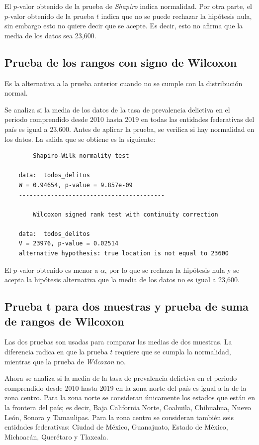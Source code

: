 \documentclass[12pt]{article}
\begin{document}
	El $p$-valor obtenido de la prueba de {\em Shapiro} indica normalidad. Por otra parte, el $p$-valor obtenido de la prueba $t$ indica que no se puede rechazar la hipótesis nula, sin embargo esto no quiere decir que se acepte. Es decir, esto no afirma que la media de los datos sea 23,600. 
	
	\subsection{Prueba de los rangos con signo de Wilcoxon}
	
	Es la alternativa a la prueba anterior cuando no se cumple con la distribución normal.
	
	Se analiza si la media de los datos de la tasa de prevalencia delictiva en el periodo comprendido desde 2010 hasta 2019 en todas las entidades federativas del país es igual a 23,600. Antes de aplicar la prueba, se verifica si hay normalidad en los datos. La salida que se obtiene es la siguiente:
	\begin{verbatim}
		Shapiro-Wilk normality test
	
	data:  todos_delitos
	W = 0.94654, p-value = 9.857e-09
	-----------------------------------------
		
		Wilcoxon signed rank test with continuity correction
	
	data:  todos_delitos
	V = 23976, p-value = 0.02514
	alternative hypothesis: true location is not equal to 23600
	\end{verbatim}

	El $p$-valor obtenido es menor a $\alpha$, por lo que se rechaza la hipótesis nula y se acepta la hipótesis alternativa que la media de los datos no es igual a 23,600.
	
	\subsection{Prueba t para dos muestras y prueba de suma de rangos de Wilcoxon} \label{wilcox-2}
	
	Las dos pruebas son usadas para comparar las medias de dos muestras. La diferencia radica en que la prueba $t$ requiere que se cumpla la normalidad, mientras que la prueba de {\em Wilcoxon} no.
	
	Ahora se analiza si la media de la tasa de prevalencia delictiva en el periodo comprendido desde 2010 hasta 2019 en la zona norte del país es igual a la de la zona centro. Para la zona norte se consideran únicamente los estados que están en la frontera del país; es decir, Baja California Norte, Coahuila, Chihuahua, Nuevo León, Sonora y Tamaulipas. Para la zona centro se consideran también seis entidades federativas: Ciudad de México, Guanajuato, Estado de México, Michoacán, Querétaro y Tlaxcala.
	
\end{document}
